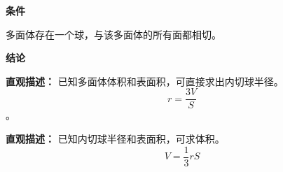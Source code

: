 \begin{statementbox}
	\textbf{\textcolor{CStatement}{条件}}
	\begin{description}[style=nextline, leftmargin=2.8em, labelsep=0.5em, itemsep=0.35em]
		\item[\textbf{\textcolor{CStatement}{条件 1（存在内切球）：}}] 多面体存在一个球，与该多面体的所有面都相切。
	\end{description}

	\textbf{\textcolor{CStatement}{结论}}
	\begin{description}[style=nextline, leftmargin=2.8em, labelsep=0.5em, itemsep=0.45em]
		\item[\textbf{\textcolor{CStatement}{结论一（内切球半径）：}}]
			\textbf{\textcolor{CStatement}{直观描述：}}
			已知多面体体积和表面积，可直接求出内切球半径。
			\[
				\boxed{r = \frac{3V}{S}}
			\]。

		\item[\textbf{\textcolor{CStatement}{推广结论（变形公式）：}}]
			\textbf{\textcolor{CStatement}{直观描述：}}
			已知内切球半径和表面积，可求体积。
			\[
				V = \frac{1}{3} r S
			\]
	\end{description}
\end{statementbox}
